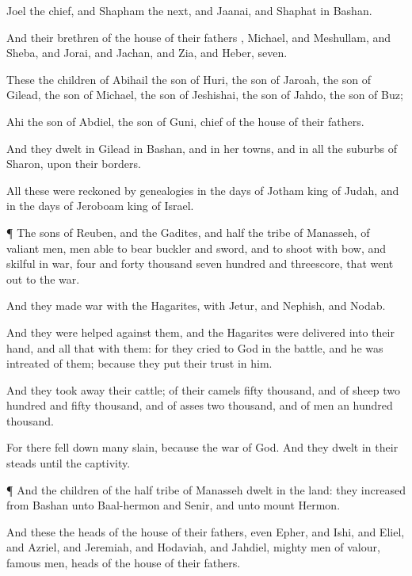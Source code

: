 {Joel the
chief, and
Shapham the
next, and
Jaanai, and
Shaphat in
Bashan.

And their
brethren of the
house of their
fathers
{},
Michael, and
Meshullam, and
Sheba, and
Jorai, and
Jachan, and
Zia, and
Heber,
seven.

These
{} the
children of
Abihail the
son of
Huri, the
son of
Jaroah, the
son of
Gilead, the
son of
Michael, the
son of
Jeshishai, the
son of
Jahdo, the
son of
Buz;

Ahi the
son of
Abdiel, the
son of
Guni,
chief of the
house of their
fathers.

And they
dwelt in
Gilead in
Bashan, and in her
towns, and in all the
suburbs of
Sharon, upon their
borders.

All these were reckoned by
genealogies in the
days of
Jotham
king of
Judah, and in the
days of
Jeroboam
king of
Israel.


\par }{\PP {}¶ The
sons of
Reuben, and the
Gadites, and
half the
tribe of
Manasseh, of valiant
men,
men able to
bear
buckler and
sword, and to
shoot with
bow, and
skilful in
war,
{}
four and
forty
thousand
seven
hundred and
threescore, that went
out to the
war.

And they
made
war with the
Hagarites, with
Jetur, and
Nephish, and
Nodab.

And they were
helped against them, and the
Hagarites were
delivered into their
hand, and all that
{} with them: for they
cried to
God in the
battle, and he was
intreated of them; because they put their
trust in him.

And they took
away their
cattle; of their
camels
fifty
thousand, and of
sheep two
hundred and
fifty
thousand, and of
asses two
thousand, and of
men an
hundred
thousand.

For there
fell down
many
slain, because the
war
{} of
God. And they
dwelt in their steads until the
captivity.


\par }{\PP {}¶ And the
children of the
half
tribe of
Manasseh
dwelt in the
land: they
increased from
Bashan unto
Baal-hermon and
Senir, and unto
mount
Hermon.

And these
{} the
heads of the
house of their
fathers, even
Epher, and
Ishi, and
Eliel, and
Azriel, and
Jeremiah, and
Hodaviah, and
Jahdiel,
mighty
men of
valour,
famous
men,
{}
heads of the
house of their
fathers.


}
